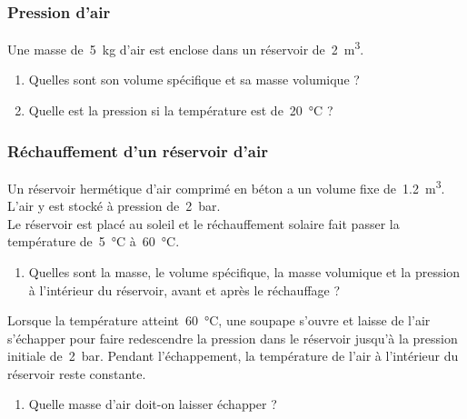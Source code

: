 \begin{boiboiboite}
	\propair
	\isentropiques
	\isothermes
\end{boiboiboite}


\subsubsection{Pression d’air}
\label{exo_pression_air}

	Une masse de~\SI{5}{\kilogram} d’air est enclose dans un réservoir de~\SI{2}{\metre\cubed}.

	\begin{enumerate}
		\item Quelles sont son volume spécifique et sa masse volumique ?
		\item Quelle est la pression si la température est de~\SI{20}{\degreeCelsius} ?
	\end{enumerate}
	
\subsubsection{Réchauffement d’un réservoir d’air}
\label{exo_rechauffement_reservoir_air}

	Un réservoir hermétique d’air comprimé en béton a un volume fixe de~\SI{1,2}{\metre\cubed}. L’air y est stocké à pression de~\SI{2}{\bar}. \\
	Le réservoir est placé au soleil et le réchauffement solaire fait passer la température de~\SI{5}{\degreeCelsius} à~\SI{60}{\degreeCelsius}.
	
	\begin{enumerate}
		\item Quelles sont la masse, le volume spécifique, la masse volumique et la pression à l’intérieur du réservoir, avant et après le réchauffage ?
	\end{enumerate}

	Lorsque la température atteint~\SI{60}{\degreeCelsius}, une soupape s’ouvre et laisse de l’air s’échapper pour faire redescendre la pression dans le réservoir jusqu’à la pression initiale de~\SI{2}{\bar}. Pendant l’échappement, la température de l’air à l’intérieur du réservoir reste constante.

	\begin{enumerate}
		\item Quelle masse d’air doit-on laisser échapper ?
	\end{enumerate}

